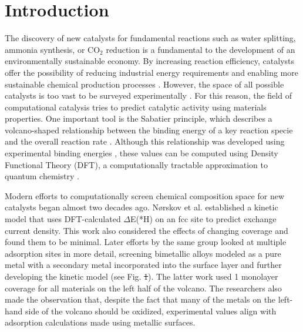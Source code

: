 \documentclass[preprint,12pt]{elsarticle}
\providecommand{\DIFadd}[1]{{\protect\color{blue}\uwave{#1}}} %
\providecommand{\DIFdel}[1]{{\protect\color{red}\sout{#1}}}                      %
\providecommand{\DIFaddbegin}{} %
\providecommand{\DIFaddend}{} %
\providecommand{\DIFdelbegin}{} %
\providecommand{\DIFdelend}{} %
\newcommand{\DIFscaledelfig}{0.5}
\newlength{\DIFdelgraphicswidth} %
\newlength{\DIFdelgraphicsheight} %
\newcommand{\DIFaddincludegraphics}[2][]{{\color{blue}\fbox{\DIFOincludegraphics[#1]{#2}}}} %
\newcommand{\DIFdelincludegraphics}[2][]{%
\sbox{\DIFdelgraphicsbox}{\DIFOincludegraphics[#1]{#2}}%
\settoboxwidth{\DIFdelgraphicswidth}{\DIFdelgraphicsbox} %
\settoboxtotalheight{\DIFdelgraphicsheight}{\DIFdelgraphicsbox} %
\scalebox{\DIFscaledelfig}{%
\parbox[b]{\DIFdelgraphicswidth}{\usebox{\DIFdelgraphicsbox}\\[-\baselineskip] \rule{\DIFdelgraphicswidth}{0em}}\llap{\resizebox{\DIFdelgraphicswidth}{\DIFdelgraphicsheight}{%
\setlength{\unitlength}{\DIFdelgraphicswidth}%
\begin{picture}(1,1)%
\thicklines\linethickness{2pt} %
{\color[rgb]{1,0,0}\put(0,0){\framebox(1,1){}}}%
{\color[rgb]{1,0,0}\put(0,0){\line( 1,1){1}}}%
{\color[rgb]{1,0,0}\put(0,1){\line(1,-1){1}}}%
\end{picture}%
}\hspace*{3pt}}} %
} %
\DeclareRobustCommand{\DIFaddbegin}{\DIFOaddbegin \let\includegraphics\DIFaddincludegraphics} %
\DeclareRobustCommand{\DIFaddend}{\DIFOaddend \let\includegraphics\DIFOincludegraphics} %
\DeclareRobustCommand{\DIFdelbegin}{\DIFOdelbegin \let\includegraphics\DIFdelincludegraphics} %
\DeclareRobustCommand{\DIFdelend}{\DIFOaddend \let\includegraphics\DIFOincludegraphics} %
\begin{document}
\raggedright
\section{Introduction}

The discovery of new catalysts for fundamental reactions such as water splitting, ammonia synthesis, or CO$_2$ reduction is a fundamental to the development of an environmentally sustainable economy. By increasing reaction efficiency, catalysts offer the possibility of reducing industrial energy requirements and enabling more sustainable chemical production processes \cite{osti_1545774}. However, the space of all possible catalysts is too vast to be surveyed experimentally \cite{tran2018active}. For this reason, the field of computational catalysis tries to predict catalytic activity using materials properties. One important tool is the Sabatier principle, which describes a volcano-shaped relationship between the binding energy of a key reaction specie and the overall reaction rate \cite{medford2015Sabatier}. Although this relationship was developed using experimental binding energies \cite{trasatti1972work}, these values can be computed using Density Functional Theory (DFT), a computationally tractable approximation to quantum chemistry \cite{osti_1545774,ooka2021sabatier}.

Modern efforts to computationally screen chemical composition space for new catalysts began almost two decades ago. N{\o}rskov et al. \cite{norskov2005trends} established a kinetic model that uses DFT-calculated $\Delta$E(*H) on an fcc site to predict exchange current density. This work also considered the effects of changing coverage and found them to be minimal. Later efforts by the same group looked at multiple adsorption sites in more detail, screening bimetallic alloys modeled as a pure metal with a secondary metal incorporated into the surface layer \cite{greeley2006computational} and further developing the kinetic model \cite{skulason2010modeling} (see Fig. \DIFdelbegin \DIFdel{1}\DIFdelend \DIFaddbegin \DIFadd{\ref{figure_1}}\DIFaddend ). The latter work used 1 monolayer coverage for all materials on the left half of the volcano. The researchers also made the observation that, despite the fact that many of the metals on the left-hand side of the volcano should be oxidized, experimental values align with adsorption calculations made using metallic surfaces. 
\end{document}

